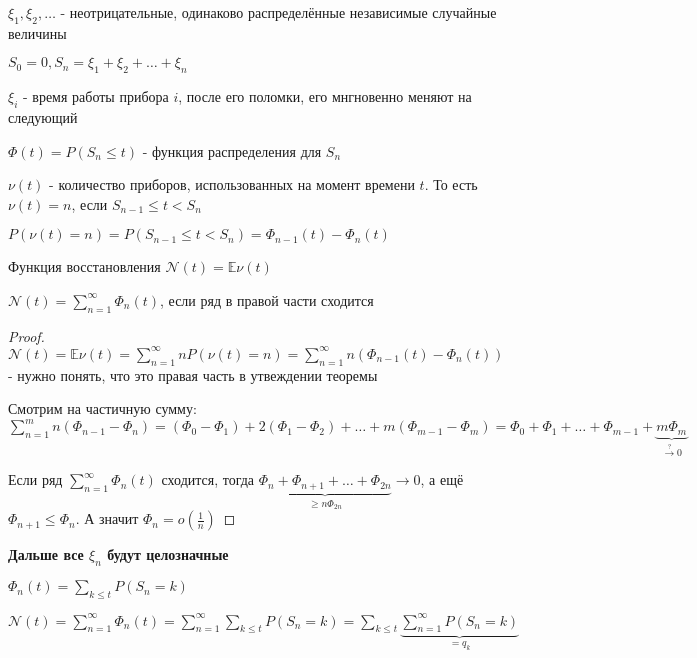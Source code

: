 
\begin{definition}
    $\xi_1, \xi_2, \ldots$ - неотрицательные, одинаково распределённые независимые случайные величины

    $S_0 = 0, S_n = \xi_1 + \xi_2 + \ldots + \xi_n$

    $\xi_i$ - время работы прибора $i$, после его поломки, его мнгновенно меняют на следующий

    $\Phi (t) = P(S_n \leqslant t)$ - функция распределения для $S_n$

    $\nu (t)$ - количество приборов, использованных на момент времени $t$. То есть $\nu (t) = n$, если $S_{n-1} \leqslant t < S_n$

    $P(\nu (t) = n) = P(S_{n - 1} \leqslant t < S_n) = \Phi_{n-1} (t) - \Phi_n (t)$

    Функция восстановления $\mathcal{N} (t) = \mathbb{E} \nu (t)$
\end{definition}

\begin{theorem}
    $\mathcal{N} (t) = \sum\limits_{n = 1}^{\infty} \Phi_n (t)$, если ряд в правой части сходится
\end{theorem}

\begin{proof}
    $\mathcal{N} (t) = \mathbb{E} \nu (t) = \sum\limits_{n = 1}^\infty n P(\nu (t) = n) = \sum\limits_{n = 1}^\infty n (\Phi_{n - 1} (t) - \Phi_n (t))$ - нужно понять, что это правая часть в утвеждении теоремы

    Смотрим на частичную сумму: $\sum\limits_{n = 1}^m n (\Phi_{n - 1} - \Phi_n) = (\Phi_0 - \Phi_1) + 2 (\Phi_1 - \Phi_2) + \ldots + m (\Phi_{m - 1} - \Phi_m) = \Phi_0 + \Phi_1 + \ldots + \Phi_{m-1} + \underbrace{m\Phi_m}_{\overset{?}{\rightarrow} 0}$

    Если ряд $\sum\limits_{n = 1}^\infty \Phi_n (t)$ сходится, тогда $\underbrace{\Phi_n + \Phi_{n+1} + \ldots + \Phi_{2n}}_{\geqslant n \Phi_{2n}} \rightarrow 0$, а ещё $\Phi_{n + 1} \leqslant \Phi_n$. А значит $\Phi_n = o \left( \frac{1}{n} \right)$
\end{proof}

\textbf{Дальше все $\xi_n$ будут целозначные}

\begin{remark}
    $\Phi_n (t) = \sum\limits_{k \leqslant t} P(S_n = k)$

    $\mathcal{N} (t) = \sum\limits_{n=1}^\infty \Phi_n (t) = \sum\limits_{n = 1}^\infty \sum\limits_{k \leqslant t} P(S_n = k) = \sum\limits_{k \leqslant t} \underbrace{\sum\limits_{n = 1}^\infty P(S_n = k)}_{=q_k}$
\end{remark}

